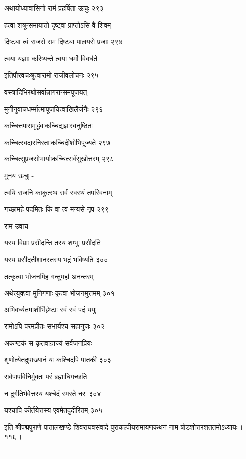 अथायोध्यावासिनो रामं प्रहर्षिता ऊचुः २९३

हत्वा शत्रून्समायातो दृष्ट्वा प्राप्तोऽसि वै शिवम्

दिष्ट्या त्वं राजसे राम दिष्ट्या पालयसे प्रजाः २९४

त्वया यज्ञाः करिष्यन्ते त्वया धर्मो विवर्धते

इतिपौरवचःश्रुत्वारामो राजीवलोचनः २९५

वस्त्रादिभिरथोसर्वान्नागरान्समपूजयत्

मुनीनुवाचधर्म्मात्मापूजयित्वाखिलैर्जनैः २९६

कच्चित्तपःसमृद्धंवःकच्चिद्यज्ञःस्वनुष्ठितः

कच्चित्स्वदारनिरताःकच्चिदीशोभिपूज्यते २९७

कच्चित्सुप्रजसोभार्याःकच्चित्सर्वंसुखोत्तरम् २९८

मुनय ऊचुः -

त्वयि राजनि काकुत्स्थ सर्वं स्वस्थं तपस्विनाम्

गच्छामहे पदमितः किं वा त्वं मन्यसे नृप २९९

राम उवाच-

यस्य विप्राः प्रसीदन्ति तस्य शम्भुः प्रसीदति

यस्य प्रसीदतीशानस्तस्य भद्रं भविष्यति ३००

तत्कृत्वा भोजनमिह गन्तुमर्हा अनन्तरम्

अथेत्युक्त्वा मुनिगणाः कृत्वा भोजनमुत्तमम् ३०१

अभिवर्ध्यतमाशीर्भिर्हृष्टाः स्वं स्वं पदं ययुः

रामोऽपि परमप्रीतः सभार्यश्च सहानुजः ३०२

अकण्टकं स कृतवान्राज्यं सर्वजनप्रियः

शृणोत्येतदुपाख्यानं यः कश्चिदपि पातकी ३०३

सर्वपापविनिर्मुक्तः परं ब्रह्माधिगच्छति

न दुर्गतिर्भवेत्तस्य यश्चेदं स्मरते नरः ३०४

यश्चापि कीर्तयेत्तस्य एवमेतदुदीरितम् ३०५

इति श्रीपद्मपुराणे पातालखण्डे शिवराघवसंवादे पुराकल्पीयरामायणकथनं नाम षोडशोत्तरशततमोऽध्यायः॥११६॥


===
